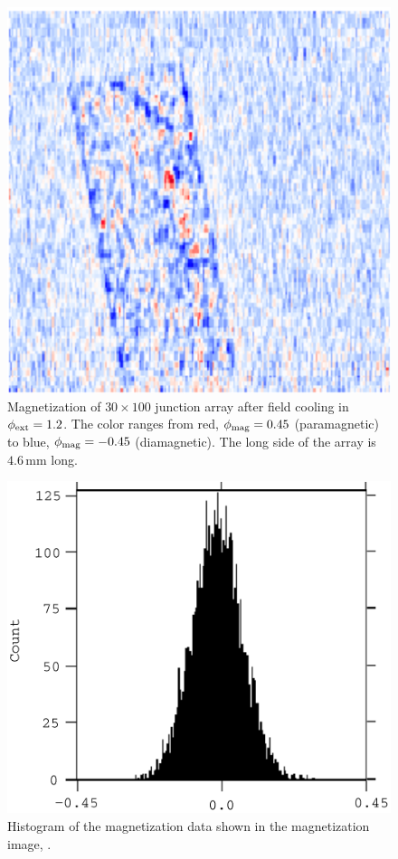 \begin{figure}[p]
\includegraphics[width=5.7in]{figs/pme_exp/fig3_6_c_lg.ps}
\caption[Magnetization of $30\times 100$ junction array after field
cooling in $\phiext = 1.2$.]{Magnetization of $30\times 100$ 
junction array after field
cooling in $\phiext = 1.2$. The color 
ranges from red, $\phi_{\mathrm{mag}} = 0.45$ (paramagnetic) 
to blue, $\phi_{\mathrm{mag}} = -0.45$ (diamagnetic). The long side of the array
is $4.6\,\mathrm{mm}$ long. }
\label{fig:paramag_image_c}
\end{figure}

\begin{figure}[p]
\includegraphics[width=5.7in]{figs/pme_exp/fig3_6_d_lg.ps}
\caption{Histogram of the magnetization data shown
in the magnetization image, .}
\label{fig:paramag_image_d}
\end{figure}

